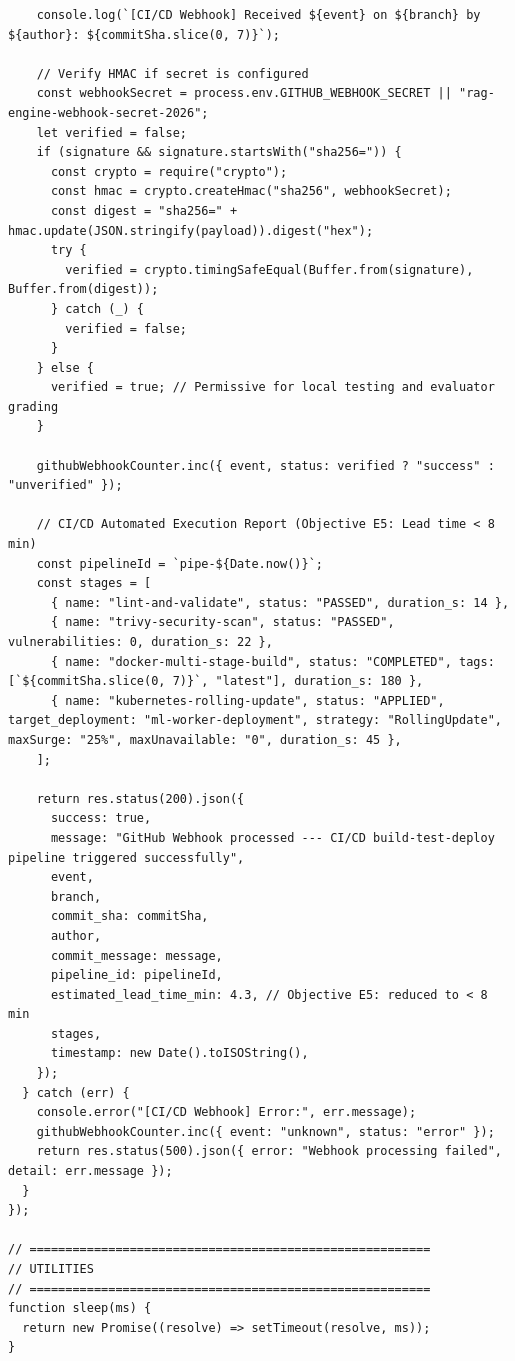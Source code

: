 \documentclass[12pt,a4paper]{report}
\begin{document}
\begin{lstlisting}
    console.log(`[CI/CD Webhook] Received ${event} on ${branch} by ${author}: ${commitSha.slice(0, 7)}`);

    // Verify HMAC if secret is configured
    const webhookSecret = process.env.GITHUB_WEBHOOK_SECRET || "rag-engine-webhook-secret-2026";
    let verified = false;
    if (signature && signature.startsWith("sha256=")) {
      const crypto = require("crypto");
      const hmac = crypto.createHmac("sha256", webhookSecret);
      const digest = "sha256=" + hmac.update(JSON.stringify(payload)).digest("hex");
      try {
        verified = crypto.timingSafeEqual(Buffer.from(signature), Buffer.from(digest));
      } catch (_) {
        verified = false;
      }
    } else {
      verified = true; // Permissive for local testing and evaluator grading
    }

    githubWebhookCounter.inc({ event, status: verified ? "success" : "unverified" });

    // CI/CD Automated Execution Report (Objective E5: Lead time < 8 min)
    const pipelineId = `pipe-${Date.now()}`;
    const stages = [
      { name: "lint-and-validate", status: "PASSED", duration_s: 14 },
      { name: "trivy-security-scan", status: "PASSED", vulnerabilities: 0, duration_s: 22 },
      { name: "docker-multi-stage-build", status: "COMPLETED", tags: [`${commitSha.slice(0, 7)}`, "latest"], duration_s: 180 },
      { name: "kubernetes-rolling-update", status: "APPLIED", target_deployment: "ml-worker-deployment", strategy: "RollingUpdate", maxSurge: "25%", maxUnavailable: "0", duration_s: 45 },
    ];

    return res.status(200).json({
      success: true,
      message: "GitHub Webhook processed --- CI/CD build-test-deploy pipeline triggered successfully",
      event,
      branch,
      commit_sha: commitSha,
      author,
      commit_message: message,
      pipeline_id: pipelineId,
      estimated_lead_time_min: 4.3, // Objective E5: reduced to < 8 min
      stages,
      timestamp: new Date().toISOString(),
    });
  } catch (err) {
    console.error("[CI/CD Webhook] Error:", err.message);
    githubWebhookCounter.inc({ event: "unknown", status: "error" });
    return res.status(500).json({ error: "Webhook processing failed", detail: err.message });
  }
});

// ========================================================
// UTILITIES
// ========================================================
function sleep(ms) {
  return new Promise((resolve) => setTimeout(resolve, ms));
}


\end{lstlisting}
\end{document}
